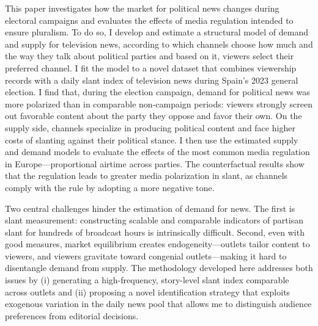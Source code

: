 \documentclass[12pt]{article}
\begin{document}
This paper investigates how the market for political news changes during electoral campaigns and evaluates the effects of media regulation intended to ensure pluralism. To do so, I develop and estimate a structural model of demand and supply for television news, according to which channels choose how much and the way they talk about political parties and based on it, viewers select their preferred channel. I fit the model to a novel dataset that combines viewership records with a daily slant index of television news during Spain's 2023 general election. I find that, during the election campaign, demand for political news was more polarized than in comparable non-campaign periods: viewers strongly screen out favorable content about the party they oppose and favor their own. On the supply side, channels specialize in producing political content and face higher costs of slanting against their political stance. I then use the estimated supply and demand models to evaluate the effects of the most common media regulation in Europe—proportional airtime across parties. The counterfactual results show that the regulation leads to greater media polarization in slant, as channels comply with the rule by adopting a more negative tone.






	
	
	Two central challenges hinder the estimation of demand for news. The first is slant measurement: constructing scalable and comparable indicators of partisan slant for hundreds of broadcast hours is intrinsically difficult. Second, even with good measures, market equilibrium creates endogeneity—outlets tailor content to viewers, and viewers gravitate toward congenial outlets—making it hard to disentangle demand from supply. The methodology developed here addresses both issues by (i) generating a high-frequency, story-level slant index comparable across outlets and (ii) proposing a novel identification strategy that exploits exogenous variation in the daily news pool that allows me to distinguish audience preferences from editorial decisions.
	
\end{document}
